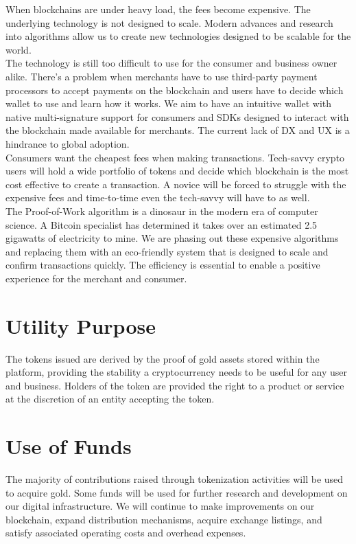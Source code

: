 \documentclass[12pt,a4paper]{article}
\begin{document}
  When blockchains are under heavy load, the fees become expensive. The
  underlying technology is not designed to scale. Modern advances and research
  into algorithms allow us to create new technologies designed to be scalable
  for the world.\\

  The technology is still too difficult to use for the consumer and business
  owner alike. There's a problem when merchants have to use third-party payment
  processors to accept payments on the blockchain and users have to decide which
  wallet to use and learn how it works. We aim to have an intuitive wallet with
  native multi-signature support for consumers and SDKs designed to interact
  with the blockchain made available for merchants. The current lack of DX and
  UX is a hindrance to global adoption.\\

  Consumers want the cheapest fees when making transactions. Tech-savvy crypto
  users will hold a wide portfolio of tokens and decide which blockchain is the
  most cost effective to create a transaction. A novice will be forced to
  struggle with the expensive fees and time-to-time even the tech-savvy will
  have to as well.\\

  \newpage
  The Proof-of-Work algorithm is a dinosaur in the modern era of computer
  science. A Bitcoin specialist has determined it takes over an estimated 2.5
  gigawatts of electricity to mine. We are phasing out these expensive
  algorithms and replacing them with an eco-friendly system that is designed to
  scale and confirm transactions quickly. The efficiency is essential to enable
  a positive experience for the merchant and consumer.\\

  \section{Utility Purpose}
  The tokens issued are derived by the proof of gold assets stored within the
  platform, providing the stability a cryptocurrency needs to be useful for any
  user and business. Holders of the token are provided the right to a product or
  service at the discretion of an entity accepting the token.

  \section{Use of Funds}
  The majority of contributions raised through tokenization activities will be
  used to acquire gold. Some funds will be used for further research and
  development on our digital infrastructure. We will continue to make
  improvements on our blockchain, expand distribution mechanisms, acquire
  exchange listings, and satisfy associated operating costs and overhead
  expenses.
\end{document}
